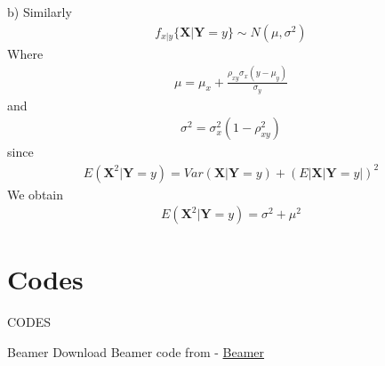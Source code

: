\documentclass{beamer}
\begin{document}
\begin{frame}
    b) Similarly 
    \begin{align}
        f_{x|y}\{\textbf{X}|\textbf{Y}=y\} \sim N(\mu,\sigma^2)
    \end{align}
    Where
    \begin{align}
        \mu = \mu_x +\frac{\rho_{xy}\sigma_x(y-\mu_y)}{\sigma_y}
    \end{align}
    and 
    \begin{align}
        \sigma^2 = \sigma_x^2(1-\rho_{xy}^2)
    \end{align}
    since
    \begin{align}
        E(\textbf{X}^2|\textbf{Y}=y) = Var(\textbf{X}|\textbf{Y}=y) + (E|\textbf{X}|\textbf{Y}=y|)^2
    \end{align}
    We obtain
    \begin{align}
        E(\textbf{X}^2|\textbf{Y}=y) = \sigma^2 + \mu^2
    \end{align}
\end{frame}

\section{Codes}
\begin{frame}{CODES}

 \begin{block}{Beamer}
         Download Beamer code from - \href{https://github.com/jarpula-Bhanu/Assignment-10/blob/main/Assignment_10.tex}{Beamer}
    \end{block}
\end{frame} 
\end{document}

